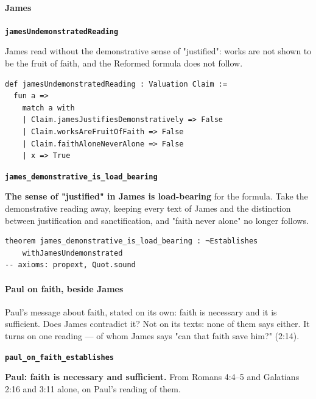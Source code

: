 \documentclass[11pt]{article}
\begin{document}
\paragraph*{James}
\leavevmode\par
\par\medskip\noindent\textbf{\texttt{james\allowbreak{}Undemonstrated\allowbreak{}Reading}}\par\nobreak\noindent
James read without the demonstrative sense of "justified": works are not shown to be the fruit of faith, and the Reformed formula does not follow.

{\small\begin{verbatim}
def jamesUndemonstratedReading : Valuation Claim :=
  fun a =>
    match a with
    | Claim.jamesJustifiesDemonstratively => False
    | Claim.worksAreFruitOfFaith => False
    | Claim.faithAloneNeverAlone => False
    | x => True
\end{verbatim}}
\par\medskip\noindent\textbf{\texttt{james\_\allowbreak{}demonstrative\_\allowbreak{}is\_\allowbreak{}load\_\allowbreak{}bearing}}\par\nobreak\noindent
\textbf{The sense of "justified" in James is load-bearing} for the formula. Take the demonstrative reading away, keeping every text of James and the distinction between justification and sanctification, and "faith never alone" no longer follows.

{\small\begin{verbatim}
theorem james_demonstrative_is_load_bearing : ¬Establishes
    withJamesUndemonstrated
-- axioms: propext, Quot.sound
\end{verbatim}}
\paragraph*{Paul on faith, beside James}
\leavevmode\par
Paul's message about faith, stated on its own: faith is necessary and it is sufficient. Does James contradict it? Not on its texts: none of them says either. It turns on one reading — of whom James says "can that faith save him?" (2:14).

\par\medskip\noindent\textbf{\texttt{paul\_\allowbreak{}on\_\allowbreak{}faith\_\allowbreak{}establishes}}\par\nobreak\noindent
\textbf{Paul: faith is necessary and sufficient.} From Romans 4:4–5 and Galatians 2:16 and 3:11 alone, on Paul's reading of them.
\end{document}
